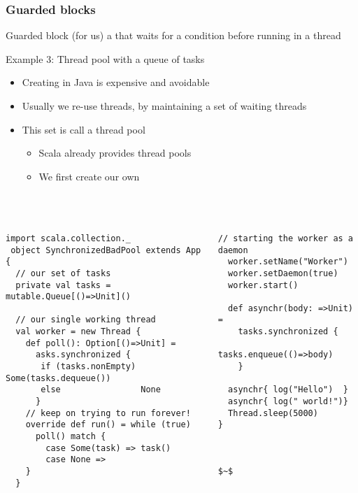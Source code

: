 \documentclass[aspectratio=169]{beamer}
\begin{document}
\begin{frame}\frametitle{Guarded blocks}
\begin{alertblock}{Guarded block (for us)}
  a  that \alert{waits for a condition} before running in a thread
\end{alertblock}

\begin{block}{Example 3: Thread pool with a queue of tasks}
  \begin{itemize}
    \item Creating  in Java is \alert{expensive} and \alert{avoidable}
    \item Usually we re-use threads, by maintaining a set of waiting threads
    \item This set is call a thread pool
      \begin{itemize}
        \item Scala already provides thread pools
        \item We first create our own
      \end{itemize}
  \end{itemize}
\end{block}
\end{frame}


\begin{frame}[fragile]\frametitle{}
~\\[-8mm]
\begin{columns}
\begin{column}{0.65\textwidth}
\begin{lstlisting}[emph={printUniqueIds,sleep,log,thread,join}]
 import scala.collection._
 object SynchronizedBadPool extends App {
  // our set of tasks
  private val tasks = mutable.Queue[()=>Unit]()
 
  // our single working thread
  val worker = new Thread {
    def poll(): Option[()=>Unit] = 
      asks.synchronized {
       if (tasks.nonEmpty) Some(tasks.dequeue())
       else                None
      }
    // keep on trying to run forever!
    override def run() = while (true)
      poll() match {
        case Some(task) => task()
        case None =>
    }
  }
\end{lstlisting}
\end{column}
\begin{column}{0.40\textwidth}
\begin{lstlisting}[emph={sleep,log,thread,join}]
  // starting the worker as a daemon
  worker.setName("Worker")
  worker.setDaemon(true)
  worker.start()

  def asynchr(body: =>Unit) =
    tasks.synchronized {
      tasks.enqueue(()=>body)
    }

  asynchr{ log("Hello")  }
  asynchr{ log(" world!")}
  Thread.sleep(5000)
}



$~$
\end{lstlisting}
\end{column}
\end{columns}
\end{frame}
\end{document}
